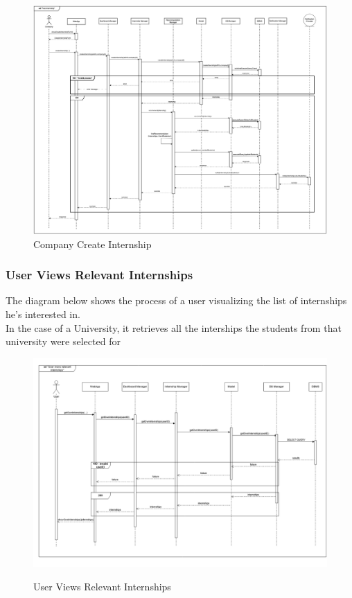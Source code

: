 \documentclass[a4paper,12pt]{article}
\begin{document}
\begin{figure}[H]
    \centering
    \includegraphics[scale = 0.25]{DD_figures/SingleDiagrams/postInternship.drawio.png}
    \caption{Company Create Internship}
    \centering
\end{figure}
\newpage

\subsubsection*{User Views Relevant Internships}
The diagram below shows the process of a user visualizing the list of internships he's interested in. \\
In the case of a University, it retrieves all the interships the students from that university were selected for
\begin{figure}[H]
\centering
\includegraphics[scale = 0.4]{DD_figures/RuntimeView/UserViewsRelevantInternshipsRV.png}\\
\caption{User Views Relevant Internships}
\end{figure}
\newpage
\end{document}
